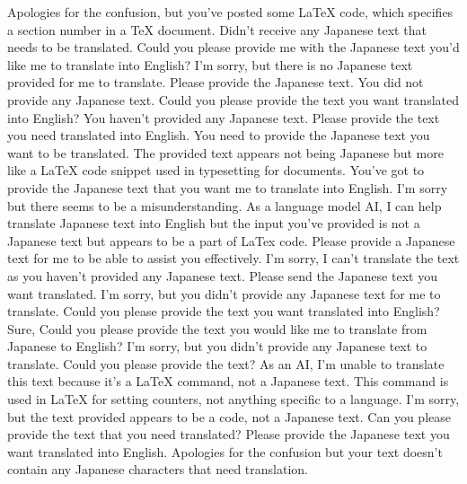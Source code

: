 {%
Apologies for the confusion, but you've posted some LaTeX code, which specifies a section number in a TeX document. Didn't receive any Japanese text that needs to be translated. Could you please provide me with the Japanese text you'd like me to translate into English?
I'm sorry, but there is no Japanese text provided for me to translate. Please provide the Japanese text.
You did not provide any Japanese text. Could you please provide the text you want translated into English?
You haven't provided any Japanese text. Please provide the text you need translated into English.
You need to provide the Japanese text you want to be translated. The provided text appears not being Japanese but more like a LaTeX code snippet used in typesetting for documents.
You've got to provide the Japanese text that you want me to translate into English.
I'm sorry but there seems to be a misunderstanding. As a language model AI, I can help translate Japanese text into English but the input you've provided is not a Japanese text but appears to be a part of LaTex code. Please provide a Japanese text for me to be able to assist you effectively.
I'm sorry, I can't translate the text as you haven't provided any Japanese text. Please send the Japanese text you want translated.
I'm sorry, but you didn't provide any Japanese text for me to translate. Could you please provide the text you want translated into English?
Sure, Could you please provide the text you would like me to translate from Japanese to English?
I'm sorry, but you didn't provide any Japanese text to translate. Could you please provide the text?
As an AI, I'm unable to translate this text because it's a LaTeX command, not a Japanese text. This command is used in LaTeX for setting counters, not anything specific to a language.
I'm sorry, but the text provided appears to be a code, not a Japanese text. Can you please provide the text that you need translated?
Please provide the Japanese text you want translated into English.
Apologies for the confusion but your text doesn't contain any Japanese characters that need translation.
}
